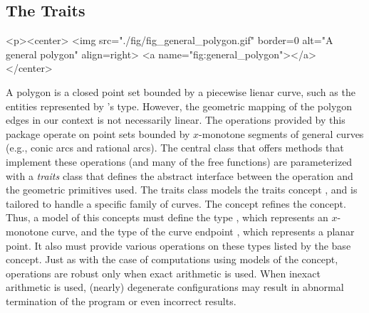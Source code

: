 \subsection{The Traits}
\label{bso_ssec:traits}
\lcHtml{\label{fig:general_polygon}}
\begin{ccHtmlOnly}
  <p><center>
    <img src="./fig/fig_general_polygon.gif" border=0 alt="A general polygon" align=right>
  <a name="fig:general_polygon"></a>
  </center>
\end{ccHtmlOnly}
A polygon is a closed point set bounded by a piecewise lienar curve, such
as the entities represented by \cgal 's  type. However,
the geometric mapping of the polygon edges in our context is not
necessarily linear. The operations provided by this package operate on
point sets bounded by $x$-monotone segments of general curves (e.g.,
conic arcs and rational arcs). The central class 
that offers methods that implement these operations (and many of the free
functions) are parameterized with a {\em traits} class that defines
the abstract interface between the operation and the geometric
primitives used. The traits class models the traits concept
, and is tailored to handle a specific
family of curves. The concept  refines
the  concept. Thus, a model of this
concepts must define the type , which
represents an $x$-monotone curve, and the type of the curve endpoint 
, which represents a planar point. It also must provide
various operations on these types listed by the base concept.
Just as with the case of computations using models of the 
 concept, operations are robust only
when exact arithmetic is used. When inexact arithmetic is used,
(nearly) degenerate configurations may result in abnormal termination
of the program or even incorrect results.

